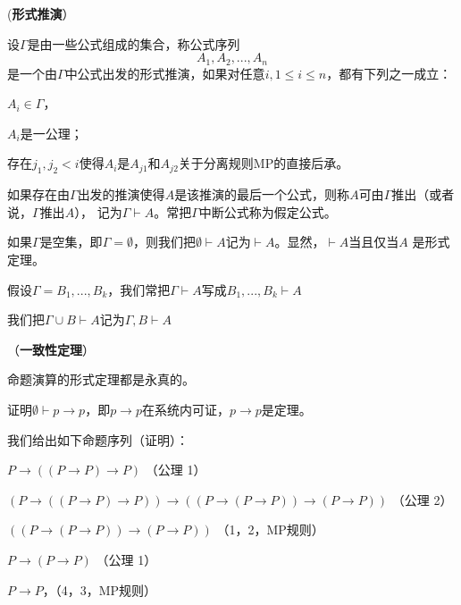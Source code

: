 \begin{defn} (\textbf{形式推演}）

设$\Gamma$是由一些公式组成的集合，称公式序列
$$A_1, A_2,..., A_n$$
是一个由$\Gamma$中公式出发的形式推演，如果对任意$i, 1 \leq i \leq n$，都有下列之一成立：
\begin{tightenum}
 \item $A_i \in \Gamma$，
 \item $A_i$是一公理；
 \item 存在$j_1, j_2 < i$使得$A_i$是$A_{j1}$和$A_{j2}$关于分离规则MP的直接后承。
\end{tightenum}
\end{defn}

如果存在由$\Gamma$出发的推演使得$A$是该推演的最后一个公式，则称$A$可由$\Gamma$推出（或者说，$\Gamma$推出$A$），
记为$\Gamma \vdash A$。常把$\Gamma$中断公式称为假定公式。


\begin{note}

\begin{tightenum}
  \item 如果$\Gamma$是空集，即$\Gamma = \emptyset$，则我们把$\emptyset \vdash A$记为$\vdash A$。显然，$\vdash A$当且仅当$A$ 是形式定理。
  \item 假设$\Gamma = {B_1,...,B_k}$，我们常把$\Gamma \vdash A$写成$B_1,...,B_k \vdash A$
  \item 我们把$\Gamma \cup {B} \vdash A$记为$\Gamma, B \vdash A$
\end{tightenum}

\end{note}




\begin{thm}（\textbf{一致性定理}）

命题演算的形式定理都是永真的。
\end{thm}






\begin{exmp}

证明$\emptyset \vdash p \to p$，即$p \to p$在系统内可证，$p \to p$是定理。

我们给出如下命题序列（证明）：
\begin{tightenum}
 \item $ P \to ((P \to P) \to P)$ （公理 1）
 \item $(P \to ((P \to P) \to P)) \to ((P \to (P \to P)) \to (P \to P))$ （公理 2）
 \item $((P \to (P \to P)) \to (P \to P))$ （1，2，MP规则）
 \item  $P \to (P \to P)$ （公理 1）
 \item  $P \to P$，（4，3，MP规则）
\end{tightenum}


\end{exmp}


